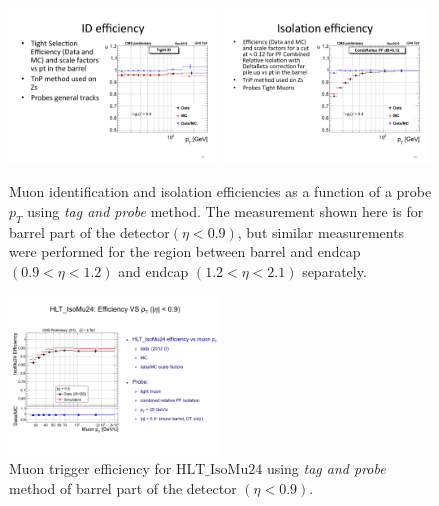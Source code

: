\begin{figure}[htbp]
	\centering
		\includegraphics[width=0.49\textwidth]{Figures/ID_eff.pdf}
		\includegraphics[width=0.49\textwidth]{Figures/ISO_eff.pdf}
	\caption[Muon identification and isolation efficiencies using \textit{tag and probe} method.]{Muon identification and isolation efficiencies as a function of a probe $p_T$ using \textit{tag and probe} method. The measurement shown here is for barrel part of the detector$(\eta<0.9)$, but similar measurements were performed for the region between barrel and endcap$(0.9<\eta<1.2)$ and endcap $(1.2<\eta<2.1)$ separately.}
	\label{fig:eff_IDISO}
\end{figure}

\begin{figure}[htbp]
	\centering
		\includegraphics[width=0.5\textwidth]{Figures/trig_eff.pdf}
	\caption[Muon trigger efficiency using \textit{tag and probe} method.]{Muon trigger efficiency for $\mathrm{HLT\_IsoMu24}$ using \textit{tag and probe} method of barrel part of the detector $(\eta<0.9)$.}
	\label{fig:eff_trig}
\end{figure}  



